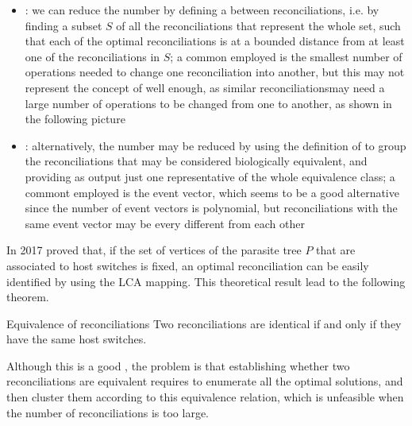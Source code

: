 \documentclass[a4paper, 12pt]{report}
\begin{document}
    \begin{itemize}
        \item {}: we can reduce the number by defining a  between reconciliations, i.e. by finding a subset $S$ of all the reconciliations that represent the whole set, such that each of the optimal reconciliations is at a bounded distance from at least one of the reconciliations in $S$; a common  employed is the smallest number of operations needed to change one reconciliation into another, but this may not represent the concept of  well enough, as similar reconciliationsmay need a large number of operations to be changed from one to another, as shown in the following picture

        \item {}: alternatively, the number may be reduced by using the definition of  to group the reconciliations that may be considered biologically equivalent, and providing as output just one representative of the whole equivalence class; a commont  employed is the event vector, which seems to be a good alternative since the number of event vectors is polynomial, but reconciliations with the same event vector may be every different from each other
    \end{itemize}

    In 2017 \textcite{gastaldello} proved that, if the set of vertices of the parasite tree $P$ that are associated to host switches is fixed, an optimal reconciliation can be easily identified by using the LCA mapping. This theoretical result lead to the following theorem.

    \begin{framedthm}{Equivalence of reconciliations}
        Two reconciliations are identical if and only if they have the same host switches.
    \end{framedthm}


    Although this is a good , the problem is that establishing whether two reconciliations are equivalent requires to enumerate all the optimal solutions, and then cluster them according to this equivalence relation, which is unfeasible when the number of reconciliations is too large.
\end{document}
